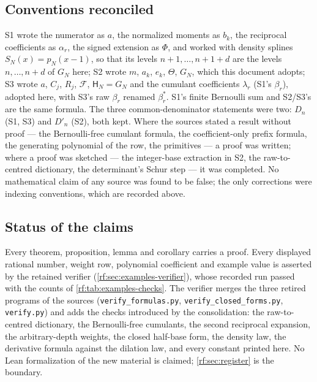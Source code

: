 \documentclass[11pt,oneside]{article}
\theoremstyle{plain}
\theoremstyle{definition}
\theoremstyle{remark}
\begin{document}
\subsection{Conventions reconciled}

S1 wrote the numerator as $a$, the normalized moments as $b_{k}$, the
reciprocal coefficients as $\alpha_{r}$, the signed extension as $\Phi$, and
worked with density splines $S_{N}(x)=p_{N}(x-1)$, so that its levels
$n+1,\ldots,n+1+d$ are the levels $n,\ldots,n+d$ of $G_{N}$ here; S2 wrote
$m$, $a_{k}$, $e_{k}$, $\Theta$, $G_{N}$, which this document adopts; S3
wrote $a$, $C_{j}$, $R_{j}$, $\mathcal F$, $\mathsf H_{N}=G_{N}$ and the
cumulant coefficients $\lambda_{r}$ (S1's $\beta_{r}$), adopted here, with
S3's raw $\beta_{r}$ renamed $\beta^{\ast}_{r}$.  S1's finite Bernoulli sum
and S2/S3's are the same formula.  The three common-denominator statements
were two: $D_{n}$ (S1, S3) and $D'_{n}$ (S2), both kept.  Where the sources
stated a result without proof --- the Bernoulli-free cumulant formula, the
coefficient-only prefix formula, the generating polynomial of the row, the
primitives --- a proof was written; where a proof was sketched --- the
integer-base extraction in S2, the raw-to-centred dictionary, the
determinant's Schur step --- it was completed.  No mathematical claim of
any source was found to be false; the only corrections were indexing
conventions, which are recorded above.

\subsection{Status of the claims}

Every theorem, proposition, lemma and corollary carries a proof.  Every
displayed rational number, weight row, polynomial coefficient and example
value is asserted by the retained verifier
(\cref{rf:sec:examples-verifier}), whose recorded run passed with the
counts of \cref{rf:tab:examples-checks}.  The verifier merges the three
retired programs of the sources (\texttt{verify\_formulas.py},
\texttt{verify\_closed\_forms.py}, \texttt{verify.py}) and adds the checks
introduced by the consolidation: the raw-to-centred dictionary, the
Bernoulli-free cumulants, the second reciprocal expansion, the arbitrary-depth
weights, the closed half-base form, the density law, the derivative formula
against the dilation law, and every constant printed here.  No Lean
formalization of the new material is claimed; \cref{rf:sec:register} is
the boundary.
\end{document}
